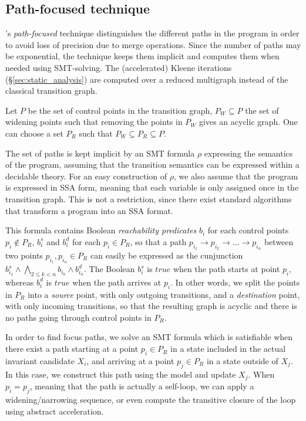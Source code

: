 \documentclass[preprint]{sigplanconf}
\begin{document}
\subsection{Path-focused technique}
\label{sec:path_focusing}

\citet{Monniaux_Gonnord_SAS11}'s \emph{path-focused} technique
distinguishes the different paths in the program in order to avoid loss of
precision due to merge operations. Since the number of paths may be exponential,
the technique keeps them implicit and computes them when needed using
SMT-solving.
The (accelerated) Kleene iterations (\S\ref{sec:static_analysis}) are computed over a reduced multigraph instead of the classical transition graph.

Let $P$ be the set of control points in the transition graph, 
$P_W \subseteq P$ the set of widening points
such that removing the points in $P_W$ gives an acyclic graph.
One can choose a set $P_R$ such that $P_W \subseteq P_R \subseteq P$.

The set of paths is kept implicit by an SMT formula $\rho$ expressing
the semantics of the program, assuming that the transition semantics can be
expressed within a decidable theory. For an easy construction of $\rho$, 
we also assume that the program is expressed in SSA form, meaning that each
variable is only assigned once in the transition graph. This is not a
restriction, since there exist standard algorithms that transform a program into
an SSA format.

This formula contains Boolean \emph{reachability predicates} $b_i$ for each
control points $p_i \notin P_R$, $b_i^s$ and $b_i^d$ for each $p_i \in P_R$, so
that a path 
$p_{i_1} \rightarrow p_{i_2} \rightarrow \dots \rightarrow p_{i_n}$ 
between two points $p_{i_1}, p_{i_n} \in P_R$ 
can easily be expressed as the
cunjunction $b_{i_1}^s \wedge \bigwedge_{2 \leq k < n} b_{i_k} \wedge b_{i_n}^d$.
The Boolean $b_{i}^s$ is $true$ when the path starts at point $p_i$, whereas
$b_i^d$ is $true$ when the path arrives at $p_i$. In other words, we split the
points in $P_R$ into a \emph{source} point, with only outgoing transitions, and
a \emph{destination} point, with only incoming transitions, so that the
resulting graph is acyclic and there is no paths going through control
points in $P_R$.

In order to find focus paths, we solve an SMT formula which is satisfiable when
there exist a path starting at a point $p_i \in P_R$ in a state included in the
actual invariant candidate $X_i$, and arriving at a point $p_j \in P_R$ in a
state outside of $X_j$. In this case, we construct this path using the model and
update $X_j$. When $p_i = p_j$, meaning that the path is actually a self-loop,
we can apply a widening/narrowing sequence, or even compute the transitive
closure of the loop using abstract acceleration. %
\end{document}
